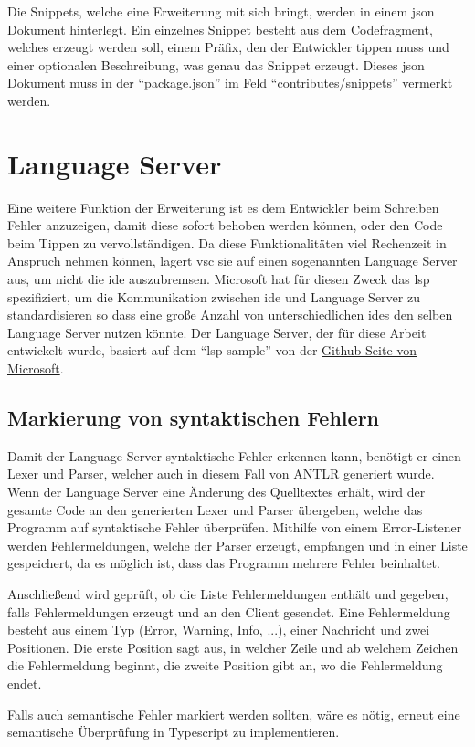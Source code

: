 Die Snippets, welche eine Erweiterung mit sich bringt, werden in einem \ac{json} Dokument hinterlegt. Ein einzelnes Snippet besteht aus dem Codefragment, welches erzeugt werden soll, einem Präfix, den der Entwickler tippen muss und einer optionalen Beschreibung, was genau das Snippet erzeugt. Dieses \ac{json} Dokument muss in der \enquote{package.json} im Feld \enquote{contributes/snippets} vermerkt werden.

\section{Language Server}
Eine weitere Funktion der Erweiterung ist es dem Entwickler beim Schreiben Fehler anzuzeigen, damit diese sofort behoben werden können, oder den Code beim Tippen zu vervollständigen. Da diese Funktionalitäten viel Rechenzeit in Anspruch nehmen können, lagert \ac{vsc} sie auf einen sogenannten Language Server aus, um nicht die \ac{ide} auszubremsen. Microsoft hat für diesen Zweck das \ac{lsp} spezifiziert, um die Kommunikation zwischen \ac{ide} und Language Server zu standardisieren so dass eine große Anzahl von unterschiedlichen \ac{ide}s den selben Language Server nutzen könnte. \cite{MicrosoftCorporation2022a} Der Language Server, der für diese Arbeit entwickelt wurde, basiert auf dem \enquote{lsp-sample} von der \href{https://github.com/microsoft/vscode-extension-samples}{Github-Seite von Microsoft}.

\subsection{Markierung von syntaktischen Fehlern}
Damit der Language Server syntaktische Fehler erkennen kann, benötigt er einen Lexer und Parser, welcher auch in diesem Fall von ANTLR generiert wurde. Wenn der Language Server eine Änderung des Quelltextes erhält, wird der gesamte Code an den generierten Lexer und Parser übergeben, welche das Programm auf syntaktische Fehler überprüfen. Mithilfe von einem Error-Listener werden Fehlermeldungen, welche der Parser erzeugt, empfangen und in einer Liste gespeichert, da es möglich ist, dass das Programm mehrere Fehler beinhaltet.

Anschließend wird geprüft, ob die Liste Fehlermeldungen enthält und gegeben, falls Fehlermeldungen erzeugt und an den Client gesendet. Eine Fehlermeldung besteht aus einem Typ (Error, Warning, Info, ...), einer Nachricht und zwei Positionen. Die erste Position sagt aus, in welcher Zeile und ab welchem Zeichen die Fehlermeldung beginnt, die zweite Position gibt an, wo die Fehlermeldung endet.

Falls auch semantische Fehler markiert werden sollten, wäre es nötig, erneut eine semantische Überprüfung in Typescript zu implementieren.


